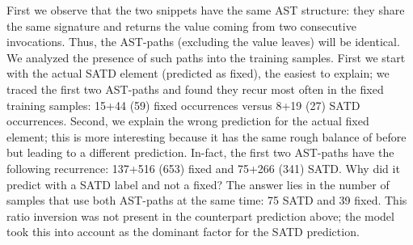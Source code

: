 First we observe that the two snippets have the same AST structure: they share the same signature and returns the value coming from two consecutive invocations. Thus, the AST-paths (excluding the value leaves) will be identical. 
We analyzed the presence of such paths into the training samples. 
First we start with the actual SATD element (predicted as fixed), the easiest to explain; we traced the first two AST-paths and found they recur most often in the fixed training samples: 15+44 (59) fixed occurrences versus 8+19 (27) SATD occurrences. 
Second, we explain the wrong prediction for the actual fixed element; this is more interesting because it has the same rough balance of before but leading to a different prediction. In-fact, the first two AST-paths have the following recurrence: 137+516 (653) fixed and 75+266 (341) SATD. Why did it predict with a SATD label and not a fixed? The answer lies in the number of samples that use both AST-paths at the same time: 75 SATD and 39 fixed. This ratio inversion was not present in the counterpart prediction above; the model took this into account as the dominant factor for the SATD prediction. 
%
%
%

%
% 
%
%

